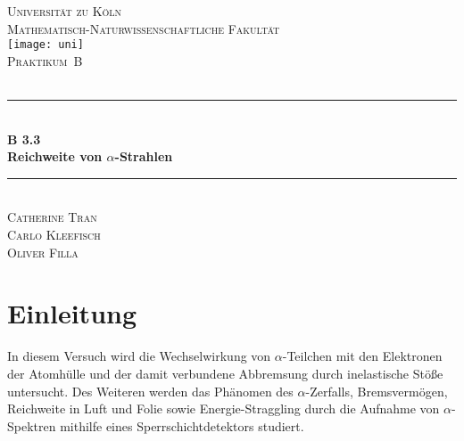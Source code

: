\documentclass[12pt,a4paper]{scrartcl}
\numberwithin{equation}{section} %
\newcommand{\HRule}{\rule{\linewidth}{0.7mm}}
\renewcommand{\[}{} %
\renewcommand{\]}{\noindent} %
\begin{document}
\begin{titlepage}
	\pagestyle{empty}

	\begin{center}

	\textsc{\LARGE Universität zu Köln }\\ [0.4cm]
	\textsc{Mathematisch-Naturwissenschaftliche Fakultät} \\[1.5cm]

	\texttt{[image: uni]}\\[1.5cm]  %

	\textsc{\Large Praktikum~B}\\[2mm]
	\textsc{}\\[10mm]
	\HRule \\[0.4cm]

		{	\Huge \bfseries B 3.3}\\[0.4cm]
			{	\huge \bfseries Reichweite von \(\alpha\)-Strahlen}\\[0.3cm]
	
	\HRule \\[3cm]

			\textsc{\Large Catherine Tran } \\[3pt]
		\textsc{\Large Carlo Kleefisch } \\[3pt]
		\textsc{\Large Oliver Filla } \\[3pt]
		
	\end{center}
\end{titlepage}

\newpage
\tableofcontents
\newpage

\hypertarget{einleitung}{%
\section{Einleitung}\label{einleitung}}

In diesem Versuch wird die Wechselwirkung von \(\alpha\)-Teilchen mit
den Elektronen der Atomhülle und der damit verbundene Abbremsung durch
inelastische Stöße untersucht. Des Weiteren werden das Phänomen des
\(\alpha\)-Zerfalls, Bremsvermögen, Reichweite in Luft und Folie sowie
Energie-Straggling durch die Aufnahme von \(\alpha\)-Spektren mithilfe
eines Sperrschichtdetektors studiert.
\end{document}
